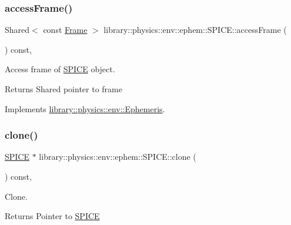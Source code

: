 \subsubsection{\texorpdfstring{access\+Frame()}{accessFrame()}}
{\footnotesize\ttfamily Shared$<$ const \hyperlink{classlibrary_1_1physics_1_1coord_1_1_frame}{Frame} $>$ library\+::physics\+::env\+::ephem\+::\+S\+P\+I\+C\+E\+::access\+Frame (\begin{DoxyParamCaption}{ }\end{DoxyParamCaption}) const\hspace{0.3cm}{\ttfamily [override]}, {\ttfamily [virtual]}}



Access frame of \hyperlink{classlibrary_1_1physics_1_1env_1_1ephem_1_1_s_p_i_c_e}{S\+P\+I\+CE} object. 

\begin{DoxyReturn}{Returns}
Shared pointer to frame 
\end{DoxyReturn}


Implements \hyperlink{classlibrary_1_1physics_1_1env_1_1_ephemeris_ac832f493239ace4d53c1c5130c1dad31}{library\+::physics\+::env\+::\+Ephemeris}.

\mbox{\label{classlibrary_1_1physics_1_1env_1_1ephem_1_1_s_p_i_c_e_a7d397f5472ec2e14d85fa493cb7c9ae0}} 
\subsubsection{\texorpdfstring{clone()}{clone()}}
{\footnotesize\ttfamily \hyperlink{classlibrary_1_1physics_1_1env_1_1ephem_1_1_s_p_i_c_e}{S\+P\+I\+CE} $\ast$ library\+::physics\+::env\+::ephem\+::\+S\+P\+I\+C\+E\+::clone (\begin{DoxyParamCaption}{ }\end{DoxyParamCaption}) const\hspace{0.3cm}{\ttfamily [override]}, {\ttfamily [virtual]}}



Clone. 

\begin{DoxyReturn}{Returns}
Pointer to \hyperlink{classlibrary_1_1physics_1_1env_1_1ephem_1_1_s_p_i_c_e}{S\+P\+I\+CE} 
\end{DoxyReturn}


